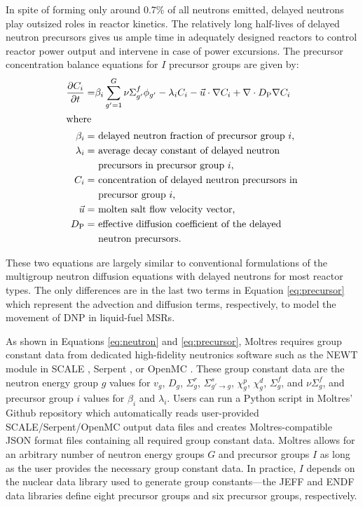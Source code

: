 In spite of forming only around 0.7\% of all neutrons emitted, delayed neutrons
play outsized roles in reactor kinetics. The relatively long half-lives of
delayed neutron precursors gives us ample time in adequately designed reactors
to control reactor power output and intervene in case of power excursions.
The precursor concentration balance equations for $I$ precursor
groups are given by:
%
\begin{align}
    \frac{\partial C_i}{\partial t} =& \beta_i \sum^G_{g'=1} \nu \Sigma^f_{g'}
    \phi_{g'} - \lambda_i C_i - \vec{u} \cdot \nabla C_i + \nabla \cdot
    D_{\text{P}} \nabla C_i \label{eq:precursor} \\
    \shortintertext{where}
    \beta_i =& \text{ delayed neutron fraction of precursor group $i$,}
    \nonumber \\
    \lambda_i =& \text{ average decay constant of delayed neutron} \nonumber \\
    &\text{ precursors in precursor group $i$,} \nonumber \\
    C_i =& \text{ concentration of delayed neutron precursors in}
    \nonumber \\
    &\text{ precursor group $i$,} \nonumber \\
    \vec{u} =& \text{ molten salt flow velocity vector,}
    \nonumber \\
    D_{\text{P}} =& \text{ effective diffusion coefficient of the delayed}
    \nonumber \\
    &\text{ neutron precursors.} \nonumber
\end{align}

These two equations are largely similar to conventional formulations of the
multigroup neutron diffusion equations with delayed neutrons for most reactor
types. The only differences are in the last two terms in Equation
\ref{eq:precursor}
which represent the advection and diffusion terms, respectively, to model the
movement of \gls{DNP} in liquid-fuel \glspl{MSR}.

As shown in Equations \ref{eq:neutron} and \ref{eq:precursor}, Moltres requires
group constant data from dedicated high-fidelity neutronics software such as
the NEWT module in SCALE \cite{dehart_reactor_2011}, Serpent
\cite{leppanen_serpent_2014}, or OpenMC \cite{romano_openmc:_2015}. These group
constant data are the neutron energy group $g$ values for $v_g$, $D_g$,
$\Sigma^r_g$, $\Sigma^s_{g' \rightarrow g}$, $\chi^p_g$, $\chi^d_g$,
$\Sigma^f_{g}$, and $\nu\Sigma^f_{g}$, and precursor group $i$ values for
$\beta_i$ and $\lambda_i$. Users
can run a Python script in Moltres' Github repository which automatically reads
user-provided SCALE/Serpent/OpenMC output data files and creates
Moltres-compatible JSON format files containing all required group constant
data. Moltres allows for an arbitrary number of neutron energy groups $G$ and
precursor groups $I$ as long as the user provides the necessary group constant
data. In practice, $I$ depends on the nuclear data library used to generate
group constants---the JEFF \cite{plompen_joint_2020} and ENDF
\cite{brown_endfb-viii0_2018} data libraries define eight precursor groups
and six precursor groups, respectively.

